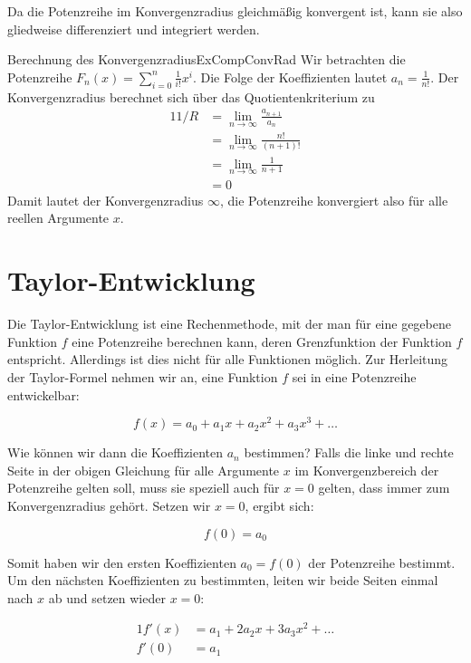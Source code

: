 Da die Potenzreihe im Konvergenzradius gleichmäßig konvergent ist, kann sie also gliedweise differenziert und integriert werden.

\begin{example}{Berechnung des Konvergenzradius}{ExCompConvRad}
    Wir betrachten die Potenzreihe $F_n(x) = \sum\limits_{i=0}^n \frac{1}{i!} x^i$. Die Folge der Koeffizienten lautet $a_n=\frac{1}{n!}$. Der Konvergenzradius berechnet sich über das Quotientenkriterium zu
    \begin{alignat*}{1}
        1/R &= \lim\limits_{n\to\infty} \frac{a_{n+1}}{a_n} \\
            &= \lim\limits_{n\to\infty} \frac{n!}{(n+1)!} \\
            &= \lim\limits_{n\to\infty} \frac{1}{n+1} \\
            &= 0
    \end{alignat*}
    Damit lautet der Konvergenzradius $\infty$, die Potenzreihe konvergiert also für alle reellen Argumente $x$.
\end{example}


\section{Taylor-Entwicklung}

Die Taylor-Entwicklung ist eine Rechenmethode, mit der man für eine gegebene Funktion $f$ eine Potenzreihe berechnen kann, deren Grenzfunktion der Funktion $f$ entspricht. Allerdings ist dies nicht für alle Funktionen möglich. Zur Herleitung der Taylor-Formel nehmen wir an, eine Funktion $f$ sei in eine Potenzreihe entwickelbar:

$$
    f(x) = a_0 + a_1 x + a_2 x^2 + a_3 x^3 + \dots
$$

Wie können wir dann die Koeffizienten $a_n$ bestimmen? Falls die linke und rechte Seite in der obigen Gleichung für alle Argumente $x$ im Konvergenzbereich der Potenzreihe gelten soll, muss sie speziell auch für $x=0$ gelten, dass immer zum Konvergenzradius gehört. Setzen wir $x=0$, ergibt sich:

$$
    f(0) = a_0
$$

Somit haben wir den ersten Koeffizienten $a_0 = f(0)$ der Potenzreihe bestimmt. Um den nächsten Koeffizienten zu bestimmten, leiten wir beide Seiten einmal nach $x$ ab und setzen wieder $x=0$:

\begin{alignat*}{1}
    f'(x) &= a_1 + 2 a_2 x + 3 a_3 x^2 + \dots \\
    f'(0) &= a_1
\end{alignat*}

